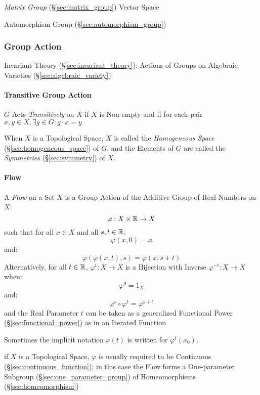 \emph{Matrix Group} (\S\ref{sec:matrix_group}) Vector Space

Automorphism Group (\S\ref{sec:automorphism_group})



\subsubsection{Group Action}\label{sec:group_action}

Invariant Theory (\S\ref{sec:invariant_theory}): Actions of Groups on
Algebraic Varieties (\S\ref{sec:algebraic_variety})



\paragraph{Transitive Group Action}\label{sec:transitive_action}\hfill

$G$ Acts \emph{Transitively} on $X$ if $X$ is Non-empty and if for each pair
$x,y \in X, \exists g \in G : g \cdot x = y$

When $X$ is a Topological Space, $X$ is called the \emph{Homogeneous Space}
(\S\ref{sec:homogeneous_space}) of $G$, and the Elements of $G$ are called the
\emph{Symmetries} (\S\ref{sec:symmetry}) of $X$.



\paragraph{Flow}\label{sec:flow}\hfill

A \emph{Flow} on a Set $X$ is a Group Action of the Additive Group of Real
Numbers on $X$:
\[
  \varphi : X \times \mathbb{R} \rightarrow X
\]
such that for all $x \in X$ and all $s,t \in \mathbb{R}$:
\[
  \varphi(x,0) = x
\]
and:
\[
  \varphi(\varphi(x,t),s) = \varphi(x,s+t)
\]
Alternatively, for all $t \in \mathbb{R}$, $\varphi^t : X \rightarrow X$ is a
Bijection with Inverse $\varphi^{-t} : X \rightarrow X$ when:
\[
  \varphi^0 = 1_X
\]
and:
\[
  \varphi^s \circ \varphi^t = \varphi^{s + t}
\]
and the Real Parameter $t$ can be taken as a generalized Functional Power
(\S\ref{sec:functional_power}) as in an Iterated Function

Sometimes the implicit notation $x(t)$ is written for $\varphi^t(x_0)$.

if $X$ is a Topological Space, $\varphi$ is usually required to be Continuous
(\S\ref{sec:continuous_function}); in this case the Flow forms a One-parameter
Subgroup (\S\ref{sec:one_parameter_group}) of Homeomorphisms
(\S\ref{sec:homeomorphism})

